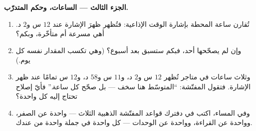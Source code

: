 \begin{problem}
\medskip\noindent\textbf{الجزء الثالث --- الساعات، وحكم
المتدرّب.}
\begin{enumerate}[resume]
  \item تُقارن ساعة المحطة بإشارة الوقت الإذاعية: فتُظهر ظهرَ
        الإشارة عند $12$ س و$2$ د. أهي مسرعة أم متأخّرة، وبكم؟
  \item وإن لم يصحّحها أحد، فبكم ستسبق بعد أسبوع؟ (وهي تكسب
        المقدار نفسه كل يوم.)
  \item وثلاث ساعات في متاجر تُظهر $12$ س و$2$ د، و$11$ س
        و$58$ د، و$12$ س تمامًا عند ظهر الإشارة. فتقول
        المفتّشة: ``المتوسّط هنا سخف --- بل صحّح كل ساعة.''
        فأيّ إصلاح تحتاج إليه كل واحدة؟
  \item وفي المساء، اكتب في دفترك قواعد المفتّشة الذهبية الثلاث
        --- واحدة عن الصفر، وواحدة عن القراءة، وواحدة عن
        الوحدات --- كل واحدة في جملة واحدة من عندك.
\end{enumerate}
\end{problem}
